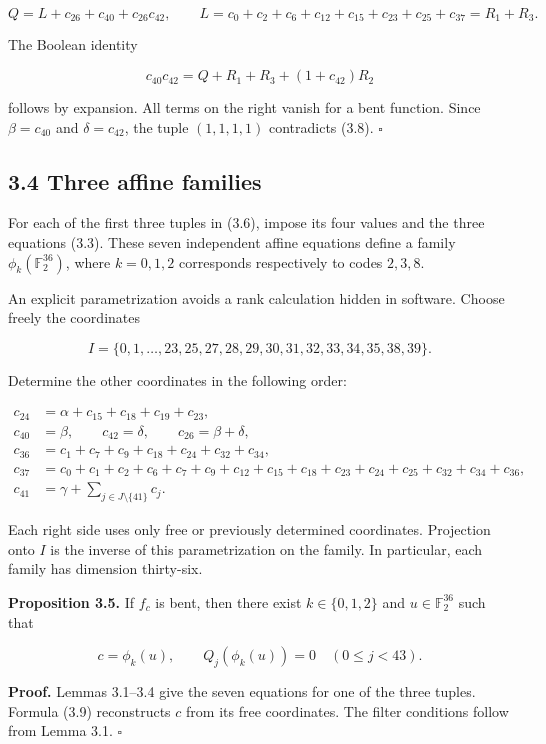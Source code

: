 \documentclass[11pt,a4paper]{article}
\begin{document}
\[
Q=L+c_{26}+c_{40}+c_{26}c_{42},\qquad
L=c_0+c_2+c_6+c_{12}+c_{15}+c_{23}+c_{25}+c_{37}=R_1+R_3.
\]

The Boolean identity

\[
c_{40}c_{42}=Q+R_1+R_3+(1+c_{42})R_2 \tag{3.8}
\]

follows by expansion. All terms on the right vanish for a bent function. Since $\beta=c_{40}$ and $\delta=c_{42}$, the tuple $(1,1,1,1)$ contradicts (3.8). \hfill$\square$

\subsection*{3.4 Three affine families}

For each of the first three tuples in (3.6), impose its four values and the three equations (3.3). These seven independent affine equations define a family $\phi_k(\mathbb F_2^{36})$, where $k=0,1,2$ corresponds respectively to codes $2,3,8$.

An explicit parametrization avoids a rank calculation hidden in software. Choose freely the coordinates

\[
I=\{0,1,\ldots,23,25,27,28,29,30,31,32,33,34,35,38,39\}.
\]

Determine the other coordinates in the following order:

\[
\begin{aligned}
c_{24}&=\alpha+c_{15}+c_{18}+c_{19}+c_{23},\\
c_{40}&=\beta,\qquad c_{42}=\delta,\qquad c_{26}=\beta+\delta,\\
c_{36}&=c_1+c_7+c_9+c_{18}+c_{24}+c_{32}+c_{34},\\
c_{37}&=c_0+c_1+c_2+c_6+c_7+c_9+c_{12}+c_{15}+c_{18}
 +c_{23}+c_{24}+c_{25}+c_{32}+c_{34}+c_{36},\\
c_{41}&=\gamma+\sum_{j\in J\setminus\{41\}}c_j.
\end{aligned} \tag{3.9}
\]

Each right side uses only free or previously determined coordinates. Projection onto $I$ is the inverse of this parametrization on the family. In particular, each family has dimension thirty-six.

\textbf{Proposition 3.5.} If $f_c$ is bent, then there exist $k\in\{0,1,2\}$ and $u\in\mathbb F_2^{36}$ such that

\[
c=\phi_k(u),\qquad Q_j(\phi_k(u))=0\quad(0\le j<43). \tag{3.10}
\]

\textbf{Proof.} Lemmas 3.1--3.4 give the seven equations for one of the three tuples. Formula (3.9) reconstructs $c$ from its free coordinates. The filter conditions follow from Lemma 3.1. \hfill$\square$
\end{document}
